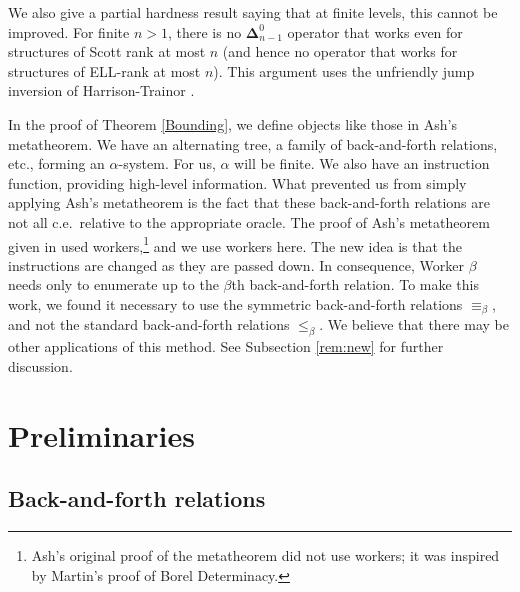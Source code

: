 \documentclass{article}
\newcommand{\ELL}{\textnormal{ELL}}
\newcommand{\bfDelta}{\boldsymbol{\Delta}}
\theoremstyle{definition}
\begin{document}
	We also give a partial hardness result saying that at finite levels, this cannot be improved.  For finite $n > 1$, there is no $\bfDelta^0_{n-1}$ operator that works even for structures of Scott rank at most $n$ (and hence no operator that works for structures of \ELL-rank at most $n$). This argument uses the unfriendly jump inversion of Harrison-Trainor \cite{unfriendly}.
	
	In the proof of Theorem \ref{Bounding}, we define objects like those in Ash's metatheorem. We have an alternating tree, a family of back-and-forth relations, etc., forming an $\alpha$-system. For us, $\alpha$ will be finite. We also have an instruction function, providing high-level information. What prevented us from simply applying Ash's metatheorem is the fact that these back-and-forth relations are not all c.e.\ relative to the appropriate oracle. The proof of Ash's metatheorem given in \cite{AK00} used workers,\footnote{ Ash's original proof of the metatheorem did not use workers; it was inspired by Martin's proof of Borel Determinacy. } and we use workers here. The new idea is that the instructions are changed as they are passed down. In consequence, Worker $\beta$ needs only to enumerate up to the $\beta$th back-and-forth relation. To make this work, we found it necessary to use the symmetric back-and-forth relations $\equiv_\beta$, and not the standard back-and-forth relations $\leq_\beta$. We believe that there may be other applications of this method. See Subsection \ref{rem:new} for further discussion. 
	
	\section{Preliminaries}
	
	\subsection{Back-and-forth relations} 
	
\end{document}
